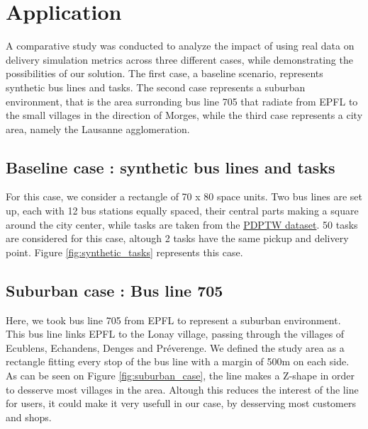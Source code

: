 \section{Application}
\label{sub:examples}

A comparative study was conducted to analyze the impact of using real data on delivery simulation metrics across three different cases, while demonstrating the possibilities of our solution. The first case, a baseline scenario, represents synthetic bus lines and tasks. The second case represents a suburban environment, that is the area surronding bus line 705 that radiate from EPFL to the small villages in the direction of Morges, while the third case represents a city area, namely the Lausanne agglomeration. 

\subsection{Baseline case : synthetic bus lines and tasks}

For this case, we consider a rectangle of 70 x 80 space units. Two bus lines are set up, each with 12 bus stations equally spaced, their central parts making a square around the city center, while tasks are taken from the \href{https://www.sintef.no/projectweb/top/pdptw/100-customers/}{PDPTW dataset}. 50 tasks are considered for this case, altough 2 tasks have the same pickup and delivery point. Figure \ref{fig:synthetic_tasks} represents this case.


\subsection{Suburban case : Bus line 705}

Here, we took bus line 705 from EPFL to represent a suburban environment. This bus line links EPFL to the Lonay village, passing through the villages of Ecublens, Echandens, Denges and Préverenge. We defined the study area as a rectangle fitting every stop of the bus line with a margin of 500m on each side.
As can be seen on Figure \ref{fig:suburban_case}, the line makes a Z-shape in order to desserve most villages in the area. Altough this reduces the interest of the line for users, it could make it very usefull in our case, by desserving most customers and shops.

